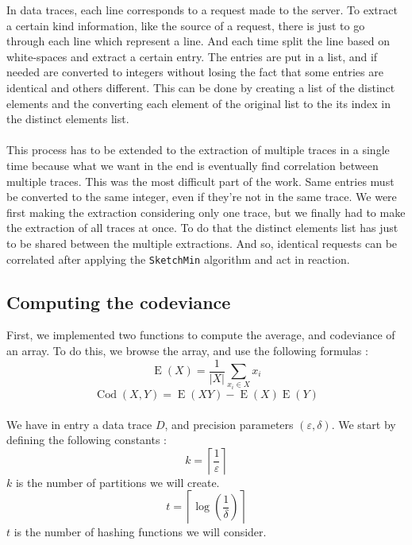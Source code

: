 \documentclass[a4paper]{article}%
\DeclareMathOperator{\E}{E}
\DeclareMathOperator{\Cod}{Cod}
\begin{document}
In data traces, each line corresponds to a request made to the server. To extract a certain kind information, like the source of a request, there is just to go through each line which represent a line. And each time split the line based on white-spaces and extract a certain entry. The entries are put in a list, and if needed are converted to integers without losing the fact that some entries are identical and others different. This can be done by creating a list of the distinct elements and the converting each element of the original list to the its index in the distinct elements list.

\paragraph{}This process has to be extended to the extraction of multiple traces in a single time because what we want in the end is eventually find correlation between multiple traces. This was the most difficult part of the work. Same entries must be converted to the same integer, even if they're not in the same trace. We were first making the extraction considering only one trace, but we finally had to make the extraction of all traces at once. To do that the distinct elements list has just to be shared between the multiple extractions. And so, identical requests can be correlated after applying the \texttt{SketchMin} algorithm and act in reaction.

\subsection{Computing the codeviance}

First, we implemented two functions to compute the average, and codeviance of an array. To do this, we browse the array, and use the following formulas :
	\[ \E(X) = \frac{1}{|X|} \sum\limits_{x_i \in X} x_i \]
	\[ \Cod(X,Y) = \E(XY) - \E(X)\E(Y) \]
	
\paragraph{}We have in entry a data trace $D$, and precision parameters $(\varepsilon, \delta)$. We start by defining the following constants :
	\[ k =\left\lceil \frac{1}{\varepsilon} \right\rceil \]
$k$ is the number of partitions we will create.
	\[ t = \left\lceil \log(\frac{1}{\delta}) \right\rceil \]
$t$ is the number of hashing functions we will consider.
	
\end{document}
